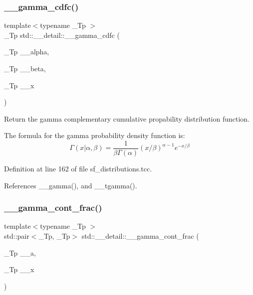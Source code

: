 \subsubsection{\texorpdfstring{\+\_\+\+\_\+gamma\+\_\+cdfc()}{\_\_gamma\_cdfc()}}
{\footnotesize\ttfamily template$<$typename \+\_\+\+Tp $>$ \\
\+\_\+\+Tp std\+::\+\_\+\+\_\+detail\+::\+\_\+\+\_\+gamma\+\_\+cdfc (\begin{DoxyParamCaption}\item[{\+\_\+\+Tp}]{\+\_\+\+\_\+alpha,  }\item[{\+\_\+\+Tp}]{\+\_\+\+\_\+beta,  }\item[{\+\_\+\+Tp}]{\+\_\+\+\_\+x }\end{DoxyParamCaption})}



Return the gamma complementary cumulative propability distribution function. 

The formula for the gamma probability density function is\+: \[ \Gamma(x|\alpha,\beta) = \frac{1}{\beta\Gamma(\alpha)} (x/\beta)^{\alpha - 1} e^{-x/\beta} \] 

Definition at line 162 of file sf\+\_\+distributions.\+tcc.



References \+\_\+\+\_\+gamma(), and \+\_\+\+\_\+tgamma().

\mbox{\label{namespacestd_1_1____detail_afd6319747af991947a02388acee40c26}} 
\subsubsection{\texorpdfstring{\+\_\+\+\_\+gamma\+\_\+cont\+\_\+frac()}{\_\_gamma\_cont\_frac()}}
{\footnotesize\ttfamily template$<$typename \+\_\+\+Tp $>$ \\
std\+::pair$<$\+\_\+\+Tp, \+\_\+\+Tp$>$ std\+::\+\_\+\+\_\+detail\+::\+\_\+\+\_\+gamma\+\_\+cont\+\_\+frac (\begin{DoxyParamCaption}\item[{\+\_\+\+Tp}]{\+\_\+\+\_\+a,  }\item[{\+\_\+\+Tp}]{\+\_\+\+\_\+x }\end{DoxyParamCaption})}



